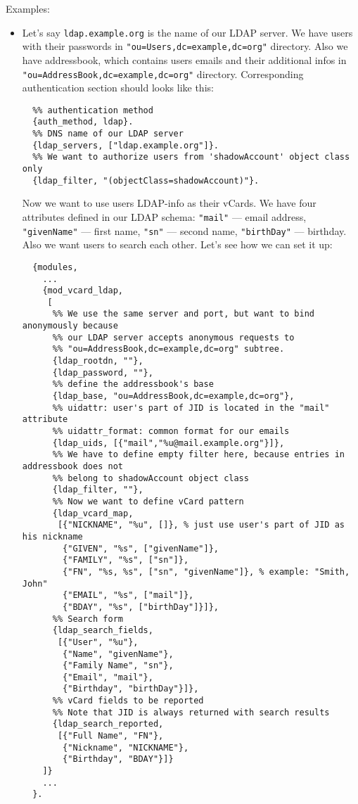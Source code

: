 \documentclass[a4paper,10pt]{article}
\newcommand{\term}[1]{\texttt{#1}}
\begin{document}
Examples:
\begin{itemize}
\item 

Let's say \term{ldap.example.org} is the name of our LDAP server. We have
users with their passwords in \term{"ou=Users,dc=example,dc=org"} directory.
Also we have addressbook, which contains users emails and their additional
infos in \term{"ou=AddressBook,dc=example,dc=org"} directory.  Corresponding
authentication section should looks like this:

\begin{verbatim}
  %% authentication method
  {auth_method, ldap}.
  %% DNS name of our LDAP server
  {ldap_servers, ["ldap.example.org"]}.
  %% We want to authorize users from 'shadowAccount' object class only
  {ldap_filter, "(objectClass=shadowAccount)"}.
\end{verbatim}

Now we want to use users LDAP-info as their vCards. We have four attributes
defined in our LDAP schema: \term{"mail"} --- email address, \term{"givenName"}
--- first name, \term{"sn"} --- second name, \term{"birthDay"} --- birthday.
Also we want users to search each other. Let's see how we can set it up:

\begin{verbatim}
  {modules,
    ...
    {mod_vcard_ldap,
     [
      %% We use the same server and port, but want to bind anonymously because
      %% our LDAP server accepts anonymous requests to
      %% "ou=AddressBook,dc=example,dc=org" subtree.
      {ldap_rootdn, ""},
      {ldap_password, ""},
      %% define the addressbook's base
      {ldap_base, "ou=AddressBook,dc=example,dc=org"},
      %% uidattr: user's part of JID is located in the "mail" attribute
      %% uidattr_format: common format for our emails
      {ldap_uids, [{"mail","%u@mail.example.org"}]},
      %% We have to define empty filter here, because entries in addressbook does not
      %% belong to shadowAccount object class
      {ldap_filter, ""},
      %% Now we want to define vCard pattern
      {ldap_vcard_map,
       [{"NICKNAME", "%u", []}, % just use user's part of JID as his nickname
        {"GIVEN", "%s", ["givenName"]},
        {"FAMILY", "%s", ["sn"]},
        {"FN", "%s, %s", ["sn", "givenName"]}, % example: "Smith, John"
        {"EMAIL", "%s", ["mail"]},
        {"BDAY", "%s", ["birthDay"]}]},
      %% Search form
      {ldap_search_fields,
       [{"User", "%u"},
        {"Name", "givenName"},
        {"Family Name", "sn"},
        {"Email", "mail"},
        {"Birthday", "birthDay"}]},
      %% vCard fields to be reported
      %% Note that JID is always returned with search results
      {ldap_search_reported,
       [{"Full Name", "FN"},
        {"Nickname", "NICKNAME"},
        {"Birthday", "BDAY"}]}
    ]}
    ...
  }.
\end{verbatim}


\end{itemize}
\end{document}
